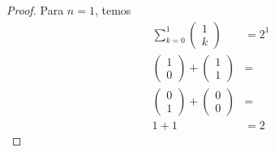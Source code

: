 \documentclass{article}
\begin{document}
\begin{proof}
Para $n = 1$, temos
\begin{equation}
	\begin{split}
	\sum\limits_{k=0}^{1}\left(\begin{array}{c} 1 \\ k \end{array} \right) &= 2^1\\
	\left(\begin{array}{c}1 \\ 0 \end{array} \right)+\left(\begin{array}{c} 1 \\ 1 \end{array} \right) & = \\
	\left(\begin{array}{c} 0 \\ 1 \end{array} \right) + \left(\begin{array}{c} 0 \\ 0 \end{array} \right) & =\\
	1 + 1 &= 2
	\end{split}
\end{equation}


\end{proof}
\end{document}
